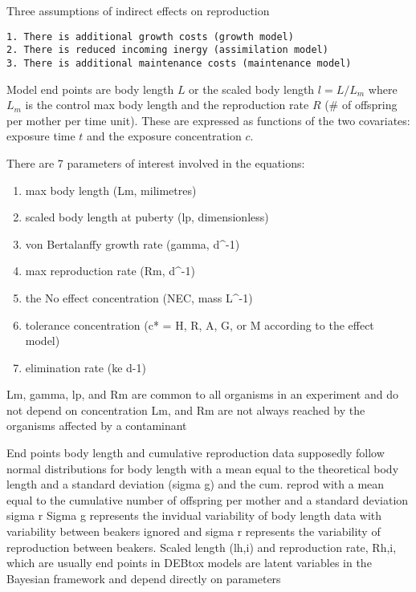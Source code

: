 \documentclass[
]{article}
\providecommand{\tightlist}{%
  \setlength{\itemsep}{0pt}\setlength{\parskip}{0pt}}
\begin{document}
Three assumptions of indirect effects on reproduction

\begin{verbatim}
1. There is additional growth costs (growth model)
2. There is reduced incoming inergy (assimilation model)
3. There is additional maintenance costs (maintenance model)
\end{verbatim}

Model end points are body length \(L\) or the scaled body length
\(l = L/L_m\) where \(L_m\) is the control max body length and the
reproduction rate \(R\) (\# of offspring per mother per time unit).
These are expressed as functions of the two covariates: exposure time
\(t\) and the exposure concentration \(c\).

There are 7 parameters of interest involved in the equations:

\begin{enumerate}
\def\labelenumi{\arabic{enumi}.}
\tightlist
\item
  max body length (Lm, milimetres)
\item
  scaled body length at puberty (lp, dimensionless)
\item
  von Bertalanffy growth rate (gamma, d\^{}-1)
\item
  max reproduction rate (Rm, d\^{}-1)
\item
  the No effect concentration (NEC, mass L\^{}-1)
\item
  tolerance concentration (c* = H, R, A, G, or M according to the effect
  model)
\item
  elimination rate (ke d-1)
\end{enumerate}

Lm, gamma, lp, and Rm are common to all organisms in an experiment and
do not depend on concentration Lm, and Rm are not always reached by the
organisms affected by a contaminant

End points body length and cumulative reproduction data supposedly
follow normal distributions for body length with a mean equal to the
theoretical body length and a standard deviation (sigma g) and the cum.
reprod with a mean equal to the cumulative number of offspring per
mother and a standard deviation sigma r Sigma g represents the invidual
variability of body length data with variability between beakers ignored
and sigma r represents the variability of reproduction between beakers.
Scaled length (lh,i) and reproduction rate, Rh,i, which are usually end
points in DEBtox models are latent variables in the Bayesian framework
and depend directly on parameters
\end{document}
